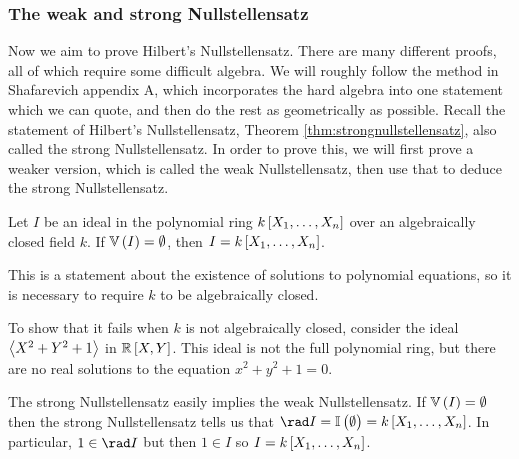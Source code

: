 \subsubsection{The weak and strong Nullstellensatz}

Now we aim to prove Hilbert's Nullstellensatz. There are many different proofs, all of which require some difficult algebra. We will roughly follow the method in Shafarevich appendix A, which incorporates the hard algebra into one statement which we can quote, and then do the rest as geometrically as possible. Recall the statement of Hilbert’s Nullstellensatz, Theorem \ref{thm:strongnullstellensatz}, also called the strong Nullstellensatz. In order to prove this, we will first prove a weaker version, which is called the weak Nullstellensatz, then use that to deduce the strong Nullstellensatz.

\begin{theorem}
Let $ I $ be an ideal in the polynomial ring $ k\sbr{X_1, \dots, X_n} $ over an algebraically closed field $ k $. If $ \VV\br{I} = \emptyset $, then $ I = k\sbr{X_1, \dots, X_n} $.
\end{theorem}

This is a statement about the existence of solutions to polynomial equations, so it is necessary to require $ k $ to be algebraically closed.

\begin{example*}
To show that it fails when $ k $ is not algebraically closed, consider the ideal $ \left\langle X^2 + Y^2 + 1 \right\rangle $ in $ \RR\sbr{X, Y} $. This ideal is not the full polynomial ring, but there are no real solutions to the equation $ x^2 + y^2 + 1 = 0 $.
\end{example*}

\begin{note*}
The strong Nullstellensatz easily implies the weak Nullstellensatz. If $ \VV\br{I} = \emptyset $ then the strong Nullstellensatz tells us that $ \rad I = \II\br{\emptyset} = k\sbr{X_1, \dots, X_n} $. In particular, $ 1 \in \rad I $ but then $ 1 \in I $ so $ I = k\sbr{X_1, \dots, X_n} $.
\end{note*}

\pagebreak

